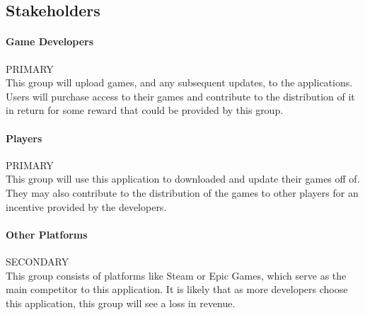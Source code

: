 
\subsection{Stakeholders}

\newcommand{\primary}{\hspace*{\fill}PRIMARY\\}
\newcommand{\secondary}{\hspace*{\fill}SECONDARY\\}
\newcommand{\tertiary}{\hspace*{\fill}TERTIARY\\}

\paragraph{Game Developers}\primary
This group will upload games, and any subsequent updates, to the applications. Users will purchase access to their games and contribute to the distribution of it in return for some reward that could be provided by this group.

\paragraph{Players}\primary
This group will use this application to downloaded and update their games off of. They may also contribute to the distribution of the games to other players for an incentive provided by the developers.

\paragraph{Other Platforms}\secondary
This group consists of platforms like Steam or Epic Games, which serve as the main competitor to this application. It is likely that as more developers choose this application, this group will see a loss in revenue.

